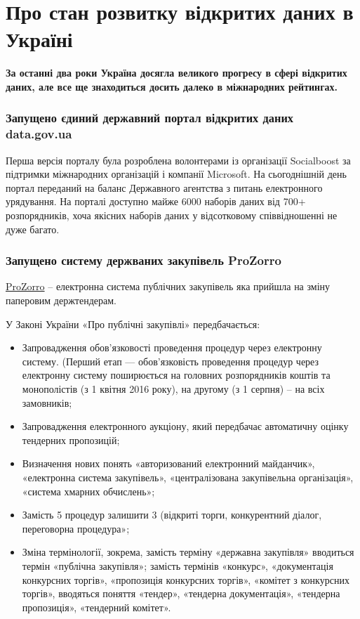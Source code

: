 \chapter{Про стан розвитку відкритих даних в Україні}

\textbf{За останні два роки Україна досягла великого прогресу в сфері відкритих даних, але все ще знаходиться досить далеко в міжнародних рейтингах.}

\subsection{Запущено єдиний державний портал відкритих даних data.gov.ua}

Перша версія порталу була розроблена волонтерами із організації Socialboost за підтримки міжнародних організацій і компанії Microsoft. На сьогоднішній день портал переданий на баланс Державного агентства з питань електронного урядування. На порталі доступно майже 6000 наборів даних від 700+ розпорядників, хоча якісних наборів даних у відсотковому співвідношенні не дуже багато.

\subsection{Запущено систему держваних закупівель ProZorro}

\href{https://prozorro.gov.ua}{ProZorro} – електронна система публічних закупівель яка прийшла на зміну паперовим держтендерам.

У Законі України «Про публічні закупівлі» передбачається:
\begin{itemize}
    \item Запровадження обов'язковості проведення процедур через електронну систему. (Перший етап — обов'язковість проведення процедур через електронну систему поширюється на головних розпорядників коштів та монополістів (з 1 квітня 2016 року), на другому (з 1 серпня) – на всіх замовників;
    \item Запровадження електронного аукціону, який передбачає автоматичну оцінку тендерних пропозицій;
    \item Визначення нових понять «авторизований електронний майданчик», «електронна система закупівель», «централізована закупівельна організація», «система хмарних обчислень»;
    \item Замість 5 процедур залишити 3 (відкриті торги, конкурентний діалог, переговорна процедура»;
    \item Зміна термінології, зокрема, замість терміну «державна закупівля» вводиться термін «публічна закупівля»; замість термінів «конкурс», «документація конкурсних торгів», «пропозиція конкурсних торгів», «комітет з конкурсних торгів», вводяться поняття «тендер», «тендерна документація», «тендерна пропозиція», «тендерний комітет».
\end{itemize}

